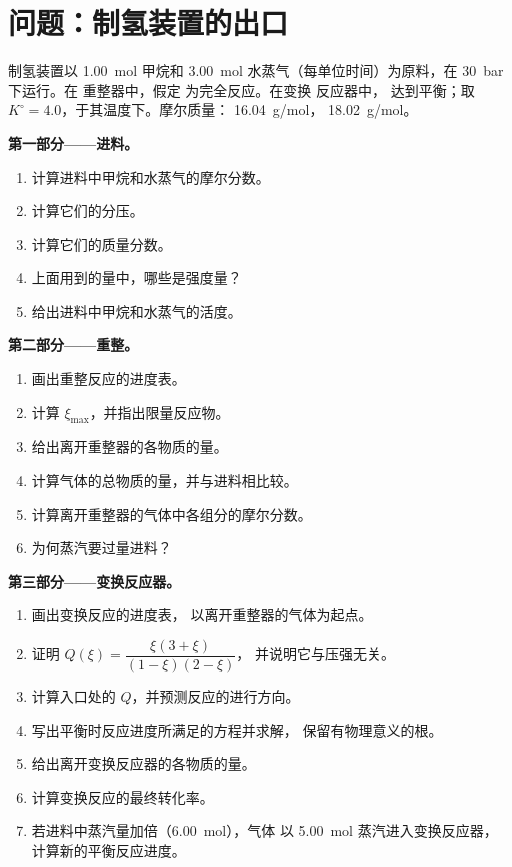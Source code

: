 \section{问题：制氢装置的出口}

\begin{problem}
\label{pb:b1:extent-q-and-k:1}
制氢装置以 \qty{1.00}{mol} 甲烷和
\qty{3.00}{mol} 水蒸气（每单位时间）为原料，在 \qty{30}{bar} 下运行。在
重整器中，假定  为完全反应。在变换
反应器中， 达到平衡；取 $K^\circ =
4.0$，于其温度下。摩尔质量： \qty{16.04}{g/mol}，
 \qty{18.02}{g/mol}。

\medskip
\noindent\textbf{第一部分——进料。}
\begin{enumerate}
  \item 计算进料中甲烷和水蒸气的摩尔分数。
  \item 计算它们的分压。
  \item 计算它们的质量分数。
  \item 上面用到的量中，哪些是强度量？
  \item 给出进料中甲烷和水蒸气的活度。
\end{enumerate}

\medskip
\noindent\textbf{第二部分——重整。}
\begin{enumerate}[resume]
  \item 画出重整反应的进度表。
  \item 计算 $\xi_{\max}$，并指出限量反应物。
  \item 给出离开重整器的各物质的量。
  \item 计算气体的总物质的量，并与进料相比较。
  \item 计算离开重整器的气体中各组分的摩尔分数。
  \item 为何蒸汽要过量进料？
\end{enumerate}

\medskip
\noindent\textbf{第三部分——变换反应器。}
\begin{enumerate}[resume]
  \item 画出变换反应的进度表，
        以离开重整器的气体为起点。
  \item 证明 $Q(\xi) = \dfrac{\xi(3 + \xi)}{(1 - \xi)(2 - \xi)}$，
        并说明它与压强无关。
  \item 计算入口处的 $Q$，并预测反应的进行方向。
  \item 写出平衡时反应进度所满足的方程并求解，
        保留有物理意义的根。
  \item 给出离开变换反应器的各物质的量。
  \item 计算变换反应的最终转化率。
  \item 若进料中蒸汽量加倍（\qty{6.00}{mol}），气体
        以 \qty{5.00}{mol} 蒸汽进入变换反应器，
        计算新的平衡反应进度。
\end{enumerate}


\end{problem}
